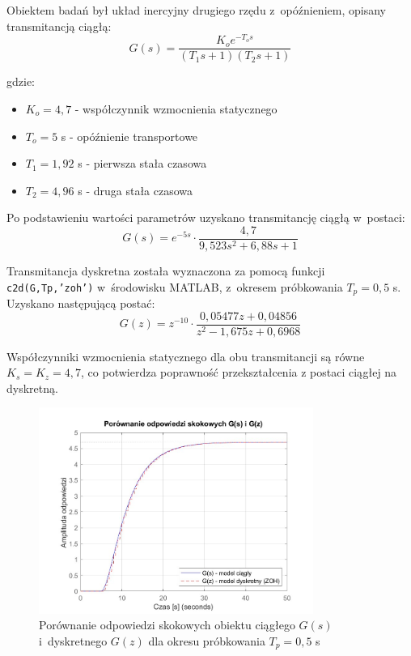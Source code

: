 \documentclass[a4paper,titlepage,11pt,floatssmall]{mwrep}
\begin{document}
Obiektem badań był układ inercyjny drugiego rzędu z~opóźnieniem, opisany transmitancją ciągłą:
\begin{equation}
    G(s) = \frac{K_o e^{-T_o s}}{(T_1 s + 1)(T_2 s + 1)}
\end{equation}

gdzie:
\begin{itemize}
    \item $K_o = 4,7$ - współczynnik wzmocnienia statycznego
    \item $T_o = 5$ s - opóźnienie transportowe
    \item $T_1 = 1,92$ s - pierwsza stała czasowa
    \item $T_2 = 4,96$ s - druga stała czasowa
\end{itemize}

Po podstawieniu wartości parametrów uzyskano transmitancję ciągłą w~postaci:
\begin{equation}
    G(s) = e^{-5s} \cdot \frac{4,7}{9,523s^2 + 6,88s + 1}
\end{equation}

Transmitancja dyskretna została wyznaczona za pomocą funkcji \texttt{c2d(G,Tp,'zoh')} w~środowisku MATLAB, z~okresem próbkowania $T_p = 0,5$ s. Uzyskano następującą postać:
\begin{equation}
    G(z) = z^{-10} \cdot \frac{0,05477z + 0,04856}{z^2 - 1,675z + 0,6968}
\end{equation}

Współczynniki wzmocnienia statycznego dla obu transmitancji są równe $K_s = K_z = 4,7$, co potwierdza poprawność przekształcenia z postaci ciągłej na dyskretną.

\begin{figure}[H]
    \centering
    \includegraphics[width=0.8\textwidth]{kod/wykresy/zad1_porownanie_odpowiedzi_skokowych.jpg}
    \caption{Porównanie odpowiedzi skokowych obiektu ciągłego $G(s)$ i~dyskretnego $G(z)$ dla okresu próbkowania $T_p = 0,5$ s}
    \label{fig:odp_skokowe}
\end{figure}
\end{document}
